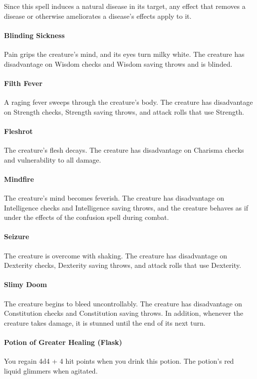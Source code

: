         Since this spell induces a natural disease in its target, any effect that removes a disease or otherwise ameliorates a disease's effects apply to it.

        \paragraph{Blinding Sickness} Pain grips the creature's mind, and its eyes turn milky white.
        The creature has disadvantage on Wisdom checks and Wisdom saving throws and is blinded.
        \paragraph{Filth Fever} A raging fever sweeps through the creature's body.
        The creature has disadvantage on Strength checks, Strength saving throws, and attack rolls that use Strength.
        \paragraph{Fleshrot} The creature's flesh decays.
        The creature has disadvantage on Charisma checks and vulnerability to all damage.
        \paragraph{Mindfire} The creature's mind becomes feverish.
        The creature has disadvantage on Intelligence checks and Intelligence saving throws, and the creature behaves as if under the effects of the confusion spell during combat.
        \paragraph{Seizure} The creature is overcome with shaking.
        The creature has disadvantage on Dexterity checks, Dexterity saving throws, and attack rolls that use Dexterity.
        \paragraph{Slimy Doom} The creature begins to bleed uncontrollably.
        The creature has disadvantage on Constitution checks and Constitution saving throws.
        In addition, whenever the creature takes damage, it is stunned until the end of its next turn.
    \paragraph{Potion of Greater Healing (Flask)}
        You regain 4d4 + 4 hit points when you drink this potion.
        The potion's red liquid glimmers when agitated.
